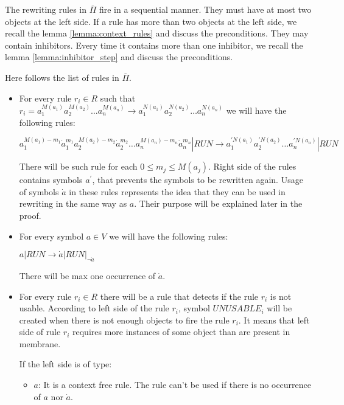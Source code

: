 \begin{dokaz}

  The rewriting rules in $\overline{\Pi}$ fire in a sequential manner.
  They must have at most two objects at the left side. If a rule has more than two objects at the left side, we recall the lemma \ref{lemma:context_rules} and discuss the preconditions.
  They may contain inhibitors. Every time it contains more than one inhibitor, we recall the lemma \ref{lemma:inhibitor_step} and discuss the preconditions. 

  Here follows the list of rules in $\overline{\Pi}$.

  \begin{itemize}
    \item For every rule $r_i\in R$ such that $r_i = a_1^{M(a_1)}a_2^{M(a_2)}\dots a_n^{M(a_n)} \rightarrow a_1^{N(a_1)}a_2^{N(a_2)}\dots a_n^{N(a_n)}$ we will have the following rules:
  
    $a_1^{M(a_1)-m_1}\dot{a}_1^{m_1}a_2^{M(a_2)-m_2}\dot{a}_2^{m_2}\dots a_n^{M(a_n)-m_n}\dot{a}_n^{m_n}|RUN \rightarrow a_1^{\prime N(a_1)}a_2^{\prime N(a_2)}\dots a_n^{\prime N(a_n)}|RUN$

    There will be such rule for each $0\leq m_j\leq M(a_j)$.
    Right side of the rules contains symbols $a^\prime$, that prevents the symbols to be rewritten again.
    Usage of symbols $\dot{a}$ in these rules represents the idea that they can be used in rewriting in the same way as $a$. Their purpose will be explained later in the proof.

    \item For every symbol $a\in V$ we will have the following rules:

    $a|RUN \rightarrow \dot{a}|RUN|_{\neg \dot{a}}$

    There will be max one occurrence of $\dot{a}$.

    \item For every rule $r_i\in R$ there will be a rule that detects if the rule $r_i$ is not usable. According to left side of the rule $r_i$, symbol $UNUSABLE_i$ will be created when there is not enough objects to fire the rule $r_i$. It means that left side of rule $r_i$ requires more instances of some object than are present in membrane.

    If the left side is of type:
    \begin{itemize}
      \item $a$: It is a context free rule. The rule can't be used if there is no occurrence of $a$ nor $\dot{a}$.


\end{itemize}
\end{itemize}
\end{dokaz}
